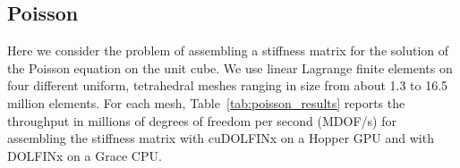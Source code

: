 \subsection*{Poisson}
%
Here we consider the problem of assembling a stiffness matrix for the solution of the Poisson equation on the unit cube. We use linear Lagrange finite elements on four different uniform, tetrahedral meshes ranging in size from about 1.3 to 16.5 million elements.  For each mesh, Table~\ref{tab:poisson_results} reports the throughput in millions of degrees of freedom per second (MDOF/s) for assembling the stiffness matrix with cuDOLFINx on a Hopper GPU and with DOLFINx on a Grace CPU.

